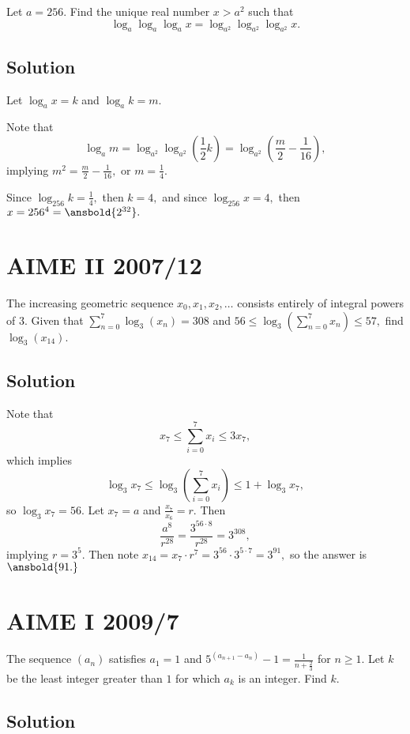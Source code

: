 \documentclass[mast]{lucky}
\begin{document}
Let $a=256$. Find the unique real number $x>a^2$ such that
\[\log_a \log_a \log_a x = \log_{a^2} \log_{a^2} \log_{a^2} x.\]

\subsection{Solution}

Let $\log_a{x}=k$ and $\log_{a}k=m.$

Note that \[\log_a{m}=\log_{a^2}\log_{a^2}(\frac{1}{2}k)=\log_{a^2}(\frac{m}{2}-\frac{1}{16}),\] implying $m^2=\frac{m}{2}-\frac{1}{16},$ or $m=\frac{1}{4}.$

Since $\log_{256}k=\frac{1}{4},$ then $k=4,$ and since $\log_{256}x=4,$ then $x=256^4=\ansbold{2^{32}}.$

\pagebreak\section{AIME II 2007/12}

The increasing geometric sequence $x_{0},x_{1},x_{2},\ldots$ consists entirely of integral powers of $3.$ Given that $\sum_{n=0}^{7}\log_{3}(x_{n}) = 308$ and $56 \leq \log_{3}\left ( \sum_{n=0}^{7}x_{n}\right ) \leq 57,$ find $\log_{3}(x_{14}).$

\subsection{Solution}

Note that
    \[x_7\leq\sum\limits_{i=0}^{7}x_i \leq 3x_7,\]
    which implies
    \[\log_{3}x_7\leq\log_3(\sum\limits_{i=0}^{7}x_i)\leq 1+\log_{3}x_7,\]
    so $\log_{3}x_7=56.$
    Let $x_7=a$ and $\frac{x_7}{x_6}=r.$ Then
    \[\frac{a^8}{r^28}=\frac{3^{56\cdot 8}}{r^28}=3^{308},\]
    implying $r=3^5.$ Then note $x_14=x_7\cdot r^7=3^{56}\cdot 3^{5\cdot 7}=3^{91},$ so the answer is $\ansbold{91.}$

\pagebreak\section{AIME I 2009/7}

The sequence $(a_n)$ satisfies $a_1 = 1$ and $5^{(a_{n + 1} - a_n)} - 1 = \frac {1}{n + \frac {2}{3}}$ for $n \geq 1$. Let $k$ be the least integer greater than $1$ for which $a_k$ is an integer. Find $k$.

\subsection{Solution}
\end{document}
